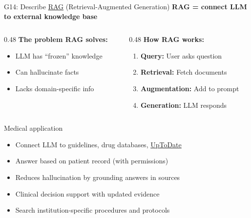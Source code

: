 \documentclass[aspectratio=169, 10pt]{beamer}
\begin{document}
\begin{frame}{G14: Describe \href{https://en.wikipedia.org/wiki/Retrieval-augmented_generation}{RAG} (Retrieval-Augmented Generation)}
    \textbf{RAG = connect LLM to external knowledge base}

    \vspace{0.2cm}
    \begin{columns}[T]
        \begin{column}{0.48\textwidth}
            \textbf{The problem RAG solves:}
            \begin{itemize}
                \item LLM has ``frozen'' knowledge
                \item Can hallucinate facts
                \item Lacks domain-specific info
            \end{itemize}
        \end{column}
        \begin{column}{0.48\textwidth}
            \textbf{How RAG works:}
            \begin{enumerate}
                \item \textbf{Query:} User asks question
                \item \textbf{Retrieval:} Fetch documents
                \item \textbf{Augmentation:} Add to prompt
                \item \textbf{Generation:} LLM responds
            \end{enumerate}
        \end{column}
    \end{columns}

    \vspace{0.15cm}
    \begin{block}{\footnotesize Medical application}
        \scriptsize
        \begin{itemize}
            \item Connect LLM to guidelines, drug databases, \href{https://www.uptodate.com/}{UpToDate}
            \item Answer based on patient record (with permissions)
            \item Reduces hallucination by grounding answers in sources
            \item Clinical decision support with updated evidence
            \item Search institution-specific procedures and protocols
        \end{itemize}
    \end{block}
\end{frame}
\end{document}
